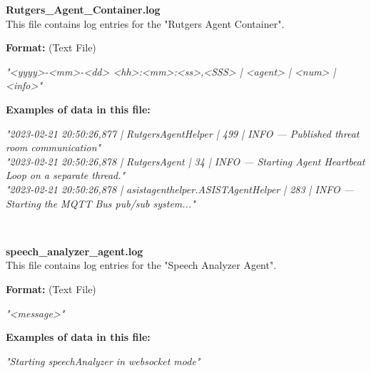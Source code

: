 \begin{description}
\begin{addmargin}[0em]{0em}
    \label{Rutgers_Agent_Container.log}
    \begin{addmargin}[1em]{0em} %
        \textbf{Rutgers\_Agent\_Container.log}\\
        This file contains log entries for the "Rutgers Agent Container".
        \begin{addmargin}[1em]{0em}
            \textbf{Format:} (Text File)
            \begin{addmargin}[1em]{0em}
                \textit{"<yyyy>-<mm>-<dd> <hh>:<mm>:<ss>,<SSS> | <agent> | <num> | <info>"}
            \end{addmargin}
        \end{addmargin}
        \begin{addmargin}[1em]{0em}
            \textbf{Examples of data in this file:}
            \begin{addmargin}[1em]{0em}\textit{"2023-02-21 20:50:26,877 | RutgersAgentHelper | 499 | INFO — Published threat room communication"\\
                "2023-02-21 20:50:26,878 | RutgersAgent | 34 | INFO — Starting Agent Heartbeat Loop on a separate thread."\\
                "2023-02-21 20:50:26,878 | asistagenthelper.ASISTAgentHelper | 283 | INFO — Starting the MQTT Bus pub/sub system..."}
            \end{addmargin}
        \end{addmargin}
    \end{addmargin} %
    \textbf{\\}

    \label{speech_analyzer_agent.log}
    \begin{addmargin}[1em]{0em} %
        \textbf{speech\_analyzer\_agent.log}\\
        This file contains log entries for the "Speech Analyzer Agent".
        \begin{addmargin}[1em]{0em}
            \textbf{Format:} (Text File)
            \begin{addmargin}[1em]{0em}
                \textit{"<message>"}
            \end{addmargin}
        \end{addmargin}
        \begin{addmargin}[1em]{0em}
            \textbf{Examples of data in this file:}
            \begin{addmargin}[1em]{0em}\textit{"Starting speechAnalyzer in websocket mode"}
            \end{addmargin}
        \end{addmargin}
    \end{addmargin} %
    \textbf{\\}


\end{addmargin}
\end{description}
